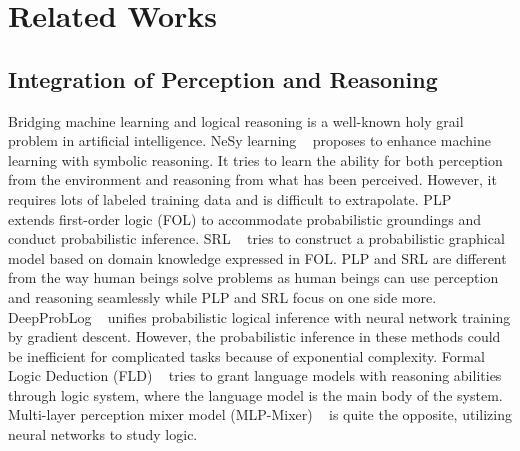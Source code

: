 \section{Related Works}
\subsection{Integration of Perception and Reasoning} 
Bridging machine learning and logical reasoning is a well-known holy grail problem in artificial intelligence. NeSy learning ~\cite{mao2019neuro} proposes to enhance machine learning with symbolic reasoning. It tries to learn the ability for both perception from the environment and reasoning from what has been perceived. However, it requires lots of labeled training data and is difficult to extrapolate. PLP ~\cite{de2015probabilistic} extends first-order logic (FOL) to accommodate probabilistic groundings and conduct probabilistic inference. SRL ~\cite{getoor2007introduction} tries to construct a probabilistic graphical model based on domain knowledge expressed in FOL. PLP and SRL are different from the way human beings solve problems as human beings can use perception and reasoning seamlessly while PLP and SRL focus on one side more. DeepProbLog ~\cite{manhaeve2018deepproblog} unifies probabilistic logical inference with neural network training by gradient descent. However, the probabilistic inference in these methods could be inefficient for complicated tasks because of exponential complexity. Formal Logic Deduction (FLD) ~\cite{morishita2023learning} tries to grant language models with reasoning abilities through logic system, where the language model is the main body of the system. Multi-layer perception mixer model (MLP-Mixer) ~\cite{amayuelas2022neural} is quite the opposite, utilizing neural networks to study logic.

